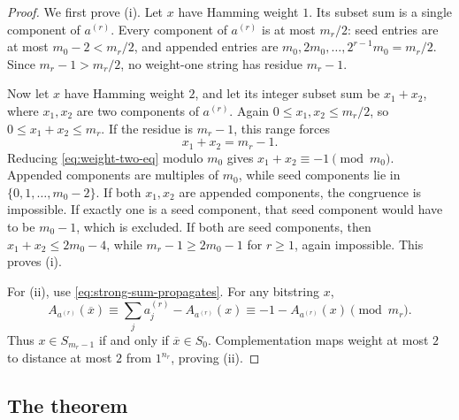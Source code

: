 \documentclass[11pt]{article}
\newcommand{\ov}[1]{\overline{#1}}
\begin{document}
\begin{proof}
We first prove (i).  Let $x$ have Hamming weight $1$.  Its subset sum is a single component of
$a^{(r)}$.  Every component of $a^{(r)}$ is at most $m_r/2$: seed entries are at most
$m_0-2<m_r/2$, and appended entries are $m_0,2m_0,\ldots,2^{r-1}m_0=m_r/2$.  Since
$m_r-1>m_r/2$, no weight-one string has residue $m_r-1$.

Now let $x$ have Hamming weight $2$, and let its integer subset sum be $x_1+x_2$, where
$x_1,x_2$ are two components of $a^{(r)}$.  Again $0\le x_1,x_2\le m_r/2$, so
$0\le x_1+x_2\le m_r$.  If the residue is $m_r-1$, this range forces
\begin{equation}
  x_1+x_2=m_r-1.
  \label{eq:weight-two-eq}
\end{equation}
Reducing \eqref{eq:weight-two-eq} modulo $m_0$ gives $x_1+x_2\equiv -1\pmod{m_0}$.  Appended
components are multiples of $m_0$, while seed components lie in $\{0,1,\ldots,m_0-2\}$.  If
both $x_1,x_2$ are appended components, the congruence is impossible.  If exactly one is a seed
component, that seed component would have to be $m_0-1$, which is excluded.  If both are seed
components, then $x_1+x_2\le2m_0-4$, while $m_r-1\ge2m_0-1$ for $r\ge1$, again impossible.  This
proves (i).

For (ii), use \eqref{eq:strong-sum-propagates}.  For any bitstring $x$,
\[
  A_{a^{(r)}}(\ov{x})\equiv \sum_j a_j^{(r)}-A_{a^{(r)}}(x)
  \equiv -1-A_{a^{(r)}}(x)\pmod{m_r}.
\]
Thus $x\in S_{m_r-1}$ if and only if $\ov{x}\in S_0$.  Complementation maps weight at most $2$
to distance at most $2$ from $1^{n_r}$, proving (ii).
\end{proof}

\subsection{The theorem}
\end{document}
